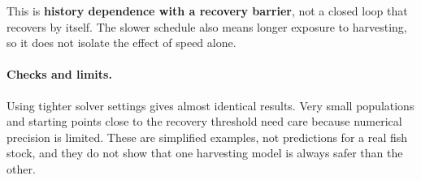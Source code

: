 This is \textbf{history dependence with a recovery barrier}, not a closed loop that recovers by itself. The slower schedule also means longer exposure to harvesting, so it does not isolate the effect of speed alone.

\paragraph{Checks and limits.} Using tighter solver settings gives almost identical results. Very small populations and starting points close to the recovery threshold need care because numerical precision is limited. These are simplified examples, not predictions for a real fish stock, and they do not show that one harvesting model is always safer than the other.
